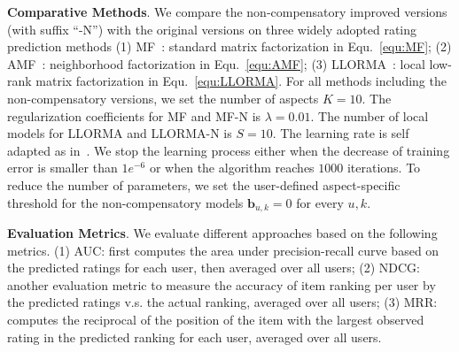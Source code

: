 \documentclass[letterpaper]{article} %
\begin{document}
\textbf{Comparative Methods}. We compare the non-compensatory improved versions (with suffix ``-N'') with the original versions on three widely adopted rating prediction methods (1) MF~\cite{Koren2009Matrix}: standard matrix factorization in Equ.~\ref{equ:MF};  (2) AMF~\cite{Koren2008Factorization}: neighborhood factorization in Equ.~\ref{equ:AMF}; (3) LLORMA~\cite{Lee2013Local}: local low-rank matrix factorization in Equ.~\ref{equ:LLORMA}. For all methods including the non-compensatory versions, we set the number of aspects $K=10$. The regularization coefficients for MF and MF-N is $\lambda=0.01$. The number of local models for LLORMA and LLORMA-N is $S=10$. The learning rate is self adapted as in~\cite{Wilson2003general}.  We stop the learning process either when the decrease of training error is smaller than $1e^{-6}$ or when the algorithm reaches $1000$ iterations. To reduce the number of parameters, we set the user-defined aspect-specific threshold for the non-compensatory models $\mathbf{b}_{u,k}=0$ for every $u,k$. 

\textbf{Evaluation Metrics}.  We evaluate different approaches based on the following metrics. (1) AUC: first computes the area under precision-recall curve based on the predicted ratings for each user, then averaged over all users; (2) NDCG: another evaluation metric to measure the accuracy of item ranking per user by the predicted ratings v.s. the actual ranking, averaged over all users;  (3)  MRR: computes the reciprocal of the position of the item with the largest observed rating in the predicted ranking for each user, averaged over all users. 
\end{document}
